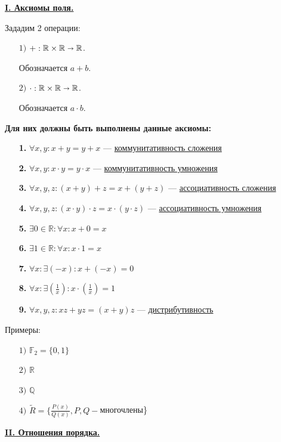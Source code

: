 \documentclass{article}
\newcommand{\deff}[1]{\underline{\textbf{#1}}}
\begin{document}
\deff{I. Аксиомы поля.}

Зададим 2 операции: 
\begin{enumerate}
    \item[$1)$] $+:\mathbb{R} \times \mathbb{R} \shortrightarrow \mathbb {R}$.

    Обозначается $a+b$.

    \item[$2)$] $\cdot: \mathbb{R} \times \mathbb{R} \shortrightarrow \mathbb {R}$.

    Обозначается $a \cdot b$.
\end{enumerate}

\textbf{Для них должны быть выполнены данные аксиомы:}

\begin{enumerate}
    \item[\textbf{1.}] $\forall x,y: x+y=y+x$ --- \uline{коммунитативность сложения}

    \item[\textbf{2.}] $\forall x,y: x\cdot y = y \cdot x$ --- \uline{коммунитативность умножения}

    \item[\textbf{3.}] $\forall x,y,z: (x+y)+z=x+(y+z)$ --- \uline{ассоциативность сложения}

    \item[\textbf{4.}] $\forall x,y,z: (x\cdot y) \cdot z = x \cdot (y \cdot z)$ --- \uline{ассоциативность умножения}

    \item[\textbf{5.}] $\exists 0 \in \mathbb{R}: \forall x: x+0=x$ 
    
    \item[\textbf{6.}] $\exists 1 \in \mathbb{R}: \forall x: x \cdot 1 =x$
    \item[\textbf{7.}] $\forall x: \exists (-x): x + (-x) = 0$
    \item[\textbf{8.}] $\forall x: \exists (\frac{1}{x}): x \cdot (\frac{1}{x}) = 1$
    \item[\textbf{9.}] $\forall x,y,z: xz+yz=(x+y)z$ --- \uline{дистрибутивность}
\end{enumerate}

Примеры:

\begin{enumerate}
\item[$1)$] $\mathbb{F}_2 =\{0,1\}$

\item[$2)$] $\mathbb{R}$

\item[$3)$] $\mathbb{Q}$

\item[$4)$] $\widetilde{R} = \{\frac{P(x)}{Q(x)}, P,Q -$многочлены\}
\end{enumerate}
\deff{II. Отношения порядка.}
\end{document}
